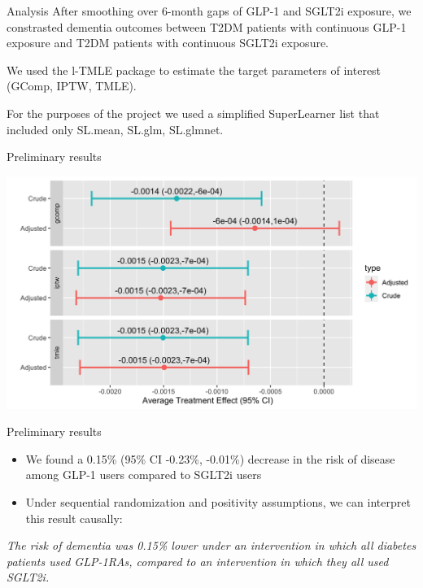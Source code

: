 \documentclass[
  ignorenonframetext,
  twocolumn]{beamer}
\begin{document}
\begin{frame}{Analysis}
\protect\hypertarget{analysis}{}
After smoothing over 6-month gaps of GLP-1 and SGLT2i exposure, we
constrasted dementia outcomes between T2DM patients with continuous
GLP-1 exposure and T2DM patients with continuous SGLT2i exposure.

We used the l-TMLE package to estimate the target parameters of interest
(GComp, IPTW, TMLE).

For the purposes of the project we used a simplified SuperLearner list
that included only SL.mean, SL.glm, SL.glmnet.
\end{frame}

\begin{frame}{Preliminary results}
\protect\hypertarget{preliminary-results}{}
\begin{center}\includegraphics[width=0.9\linewidth,height=0.75\textheight]{forestplot} \end{center}
\end{frame}

\begin{frame}{Preliminary results}
\protect\hypertarget{preliminary-results-1}{}
\begin{itemize}
\item
  We found a 0.15\% (95\% CI -0.23\%, -0.01\%) decrease in the risk of
  disease among GLP-1 users compared to SGLT2i users
\item
  Under sequential randomization and positivity assumptions, we can
  interpret this result causally:
\end{itemize}

\emph{The risk of dementia was 0.15\% lower under an intervention in
which all diabetes patients used GLP-1RAs, compared to an intervention
in which they all used SGLT2i.}
\end{frame}
\end{document}
